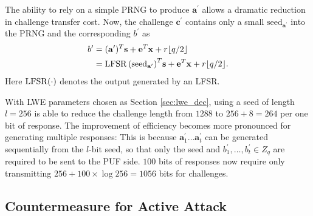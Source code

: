 The ability to rely on a simple PRNG to produce $\mathbf{a}^\prime$ allows a dramatic reduction in challenge transfer cost. 
Now, the challenge $\mathbf{c}^\prime$ contains only a small $\text{seed}_{\mathbf{a}^\prime}$ into the PRNG and the corresponding $b^\prime$ as
\begin{align*}
    b^\prime&=(\mathbf{a}^\prime)^T\mathbf{s}+\mathbf{e}^T\mathbf{x}+r\floor{q/2}\\
    &= \LFSR{(\text{seed}_{\mathbf{a}^\prime})}^T\mathbf{s}+\mathbf{e}^T\mathbf{x}+r\floor{q/2}.
\end{align*}
Here $\LFSR(\cdot)$ denotes the output generated by an LFSR.




With LWE parameters chosen as Section \ref{sec:lwe_dec}, using a seed of length $l=256$ is able to reduce the challenge length from $1288$ to $256+8=264$ per one bit of response. 
The improvement of efficiency becomes more pronounced for generating multiple responses:
This is because $\mathbf{a}^\prime_1 \ldots \mathbf{a}^\prime_t$ can be generated sequentially from the $l$-bit seed, so that only the seed and $b^\prime_1,\ldots, b^\prime_t \in Z_q$ are required to be sent to the PUF side. 
$100$ bits of responses now require only transmitting $256+100\times\log 256 = 1056$ bits for challenges.

\subsection{Countermeasure for Active Attack}
\label{sec:counter}

